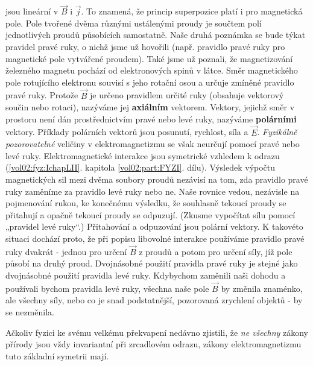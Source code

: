     jsou lineární v \(\vec{B}\) i \(\vec{j}\). To znamená, že princip superpozice platí i pro
    magnetická pole. Pole tvořené dvěma různými ustálenými proudy je součtem polí jednotlivých
    proudů působících samostatně. Naše druhá poznámka se bude týkat pravidel pravé ruky, o nichž
    jsme už hovořili (např. pravidlo pravé ruky pro magnetické pole vytvářené proudem). Také jsme už
    poznali, že magnetizování železného magnetu pochází od elektronových spinů v látce. Směr
    magnetického pole rotujícího elektronu souvisí s jeho rotační osou a určuje zmíněné pravidlo
    pravé ruky. Protože \(\vec{B}\) je určeno pravidlem určité ruky (obsahuje vektorový součin nebo
    rotaci), nazýváme jej \textbf{axiálním} vektorem. Vektory, jejichž směr v prostoru není dán
    prostřednictvím pravé nebo levé ruky, nazýváme \textbf{polárními} vektory. Příklady polárních
    vektorů jsou posunutí, rychlost, síla a \(\vec{E}\). \emph{Fyzikálně pozorovatelné} veličiny v
    elektromagnetizmu se však neurčují pomocí pravé nebo levé ruky. Elektromagnetické interakce jsou
    symetrické vzhledem k odrazu (\ref{vol02:fyz:IchapLII}. kapitola \ref{vol02:part:FYZI}. dílu). Výsledek
    výpočtu magnetických sil mezi dvěma soubory proudů nezávisí na tom, zda pravidlo pravé ruky
    zaměníme za pravidlo levé ruky nebo ne. Naše rovnice vedou, nezávisle na pojmenování rukou, ke
    konečnému výsledku, že souhlasně tekoucí proudy se přitahují a opačně tekoucí proudy se
    odpuzují. (Zkusme vypočítat sílu pomocí „pravidel levé ruky“.) Přitahování a odpuzování jsou
    polární vektory. K takovéto situaci dochází proto, že při popisu libovolné interakce používáme
    pravidlo pravé ruky dvakrát - jednou pro určení \(\vec{B}\) z proudů a potom pro určení síly,
    jíž pole působí na druhý proud. Dvojnásobné použití pravidla pravé ruky je stejné jako
    dvojnásobné použití pravidla levé ruky. Kdybychom zaměnili naši dohodu a používali bychom
    pravidla levé ruky, všechna naše pole \(\vec{B}\) by změnila znaménko, ale všechny síly, nebo co
    je snad podstatnější, pozorovaná zrychlení objektů - by se nezměnila.
    
    Ačkoliv fyzici ke svému velkému překvapení nedávno zjistili, že \emph{ne všechny} zákony přírody
    jsou vždy invariantní při zrcadlovém odrazu, zákony elektromagnetizmu tuto základní symetrii
    mají.

